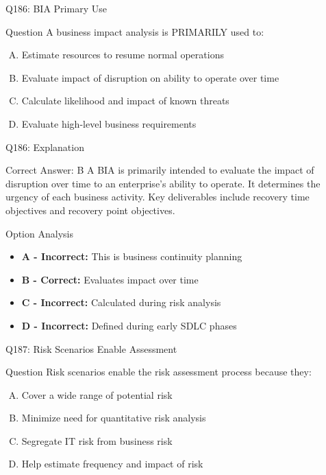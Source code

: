 \documentclass{beamer}
\begin{document}
	\begin{frame}{Q186: BIA Primary Use}
		\begin{block}{Question}
			A business impact analysis is PRIMARILY used to:
		\end{block}
		\begin{enumerate}[(A)]
			\item Estimate resources to resume normal operations
			\item Evaluate impact of disruption on ability to operate over time
			\item Calculate likelihood and impact of known threats
			\item Evaluate high-level business requirements
		\end{enumerate}
	\end{frame}
	
	\begin{frame}{Q186: Explanation}
		\begin{block}{Correct Answer: B}
			A BIA is primarily intended to evaluate the impact of disruption over time to an enterprise's ability to operate. It determines the urgency of each business activity. Key deliverables include recovery time objectives and recovery point objectives.
		\end{block}
		\begin{block}{Option Analysis}
			\begin{itemize}
				\item \textbf{A - Incorrect:} This is business continuity planning
				\item \textbf{B - Correct:} Evaluates impact over time
				\item \textbf{C - Incorrect:} Calculated during risk analysis
				\item \textbf{D - Incorrect:} Defined during early SDLC phases
			\end{itemize}
		\end{block}
	\end{frame}
	
	\begin{frame}{Q187: Risk Scenarios Enable Assessment}
		\begin{block}{Question}
			Risk scenarios enable the risk assessment process because they:
		\end{block}
		\begin{enumerate}[(A)]
			\item Cover a wide range of potential risk
			\item Minimize need for quantitative risk analysis
			\item Segregate IT risk from business risk
			\item Help estimate frequency and impact of risk
		\end{enumerate}
	\end{frame}
	
\end{document}
